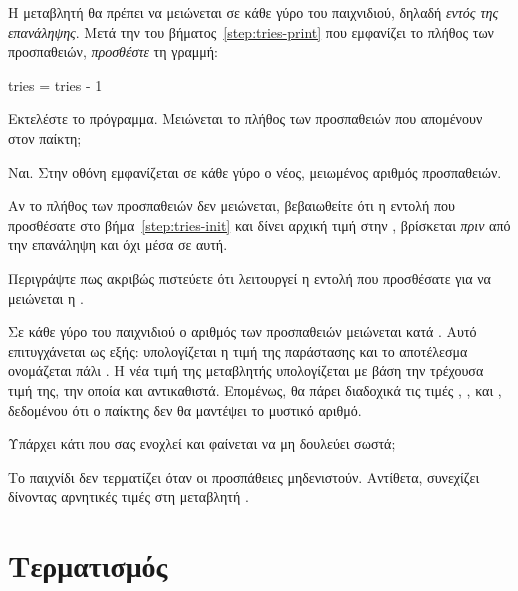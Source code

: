 \documentclass[a4paper,11pt,oneside]{book}
\begin{document}
\begin{step}
Η μεταβλητή  θα πρέπει να μειώνεται σε κάθε γύρο του παιχνιδιού, δηλαδή \emph{εντός της επανάληψης}. Μετά την  του βήματος~\ref{step:tries-print} που εμφανίζει το πλήθος των προσπαθειών, \emph{προσθέστε} τη γραμμή:

\begin{pynew}
    tries = tries - 1
\end{pynew}

Εκτελέστε το πρόγραμμα. Μειώνεται το πλήθος των προσπαθειών που απομένουν στον παίκτη;

\begin{answer}
	Ναι. Στην οθόνη εμφανίζεται σε κάθε γύρο ο νέος, μειωμένος αριθμός προσπαθειών.
\end{answer}

\marginnote[14pt]{\iconcaution}
Αν το πλήθος των προσπαθειών δεν μειώνεται, βεβαιωθείτε ότι η εντολή που προσθέσατε στο βήμα~\ref{step:tries-init} και δίνει αρχική τιμή στην , βρίσκεται \emph{πριν} από την επανάληψη και όχι μέσα σε αυτή.

Περιγράψτε πως ακριβώς πιστεύετε ότι λειτουργεί η εντολή που προσθέσατε για να μειώνεται η .

\begin{answer}
	Σε κάθε γύρο του παιχνιδιού ο αριθμός των προσπαθειών μειώνεται κατά . Αυτό επιτυγχάνεται ως εξής: υπολογίζεται η τιμή της παράστασης  και το αποτέλεσμα ονομάζεται πάλι . Η νέα τιμή της μεταβλητής  υπολογίζεται με βάση την τρέχουσα τιμή της, την οποία και αντικαθιστά. Επομένως, θα πάρει διαδοχικά τις τιμές , ,  και , δεδομένου ότι ο παίκτης δεν θα μαντέψει το μυστικό αριθμό.
\end{answer}

Υπάρχει κάτι που σας ενοχλεί και φαίνεται να μη δουλεύει σωστά;

\begin{answer}
Το παιχνίδι δεν τερματίζει όταν οι προσπάθειες μηδενιστούν. Αντίθετα, συνεχίζει δίνοντας αρνητικές τιμές στη μεταβλητή .
\end{answer}
\end{step}
 
\section{Τερματισμός}
\end{document}
